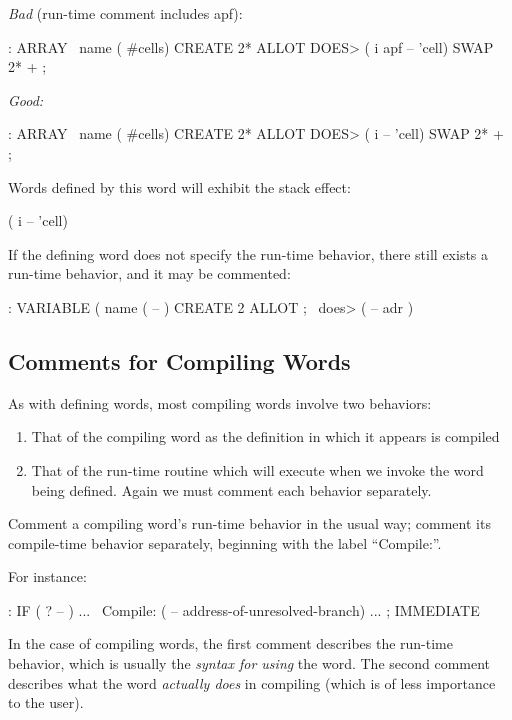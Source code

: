 \bigskip\noindent
\emph{Bad} (run-time comment includes apf):
\begin{Code}
: ARRAY   \  name  ( #cells)
   CREATE 2* ALLOT
   DOES>   ( i apf -- 'cell)  SWAP  2* + ;
\end{Code}
\goodbreak\noindent
\emph{Good:}
\begin{Code}
: ARRAY   \  name  ( #cells)
   CREATE 2* ALLOT
    DOES>  ( i -- 'cell)  SWAP  2* + ;
\end{Code}
Words defined by this word  will exhibit the stack effect:
\begin{Code}
( i -- 'cell)
\end{Code}
If the defining word does not specify the run-time behavior, there still
exists a run-time behavior, and it may be commented:
\begin{Code}
: VARIABLE   (  name  ( -- )  CREATE  2 ALLOT ;
   \ does>   ( -- adr )
\end{Code}
%

\subsection{Comments for Compiling Words}
As with defining words, most compiling words involve two behaviors:
\begin{enumerate}
\item That of the compiling word as the definition in which it appears
is compiled
\item That of the run-time routine which will execute when we invoke
the word being defined.  Again we must comment each behavior
separately.
\end{enumerate}

\begin{tip}
Comment a compiling word's run-time behavior in the usual way; comment
its compile-time behavior separately, beginning with the label
``Compile:''.
\end{tip}
For instance:
\begin{Code}
: IF   ( ? -- ) ...
\ Compile:   ( -- address-of-unresolved-branch)
   ... ; IMMEDIATE
\end{Code}
In the case of compiling words, the first comment describes the
run-time behavior, which is usually the \emph{syntax for using} the
word.  The second comment describes what the word \emph{actually does}
in compiling (which is of less importance to the user).

